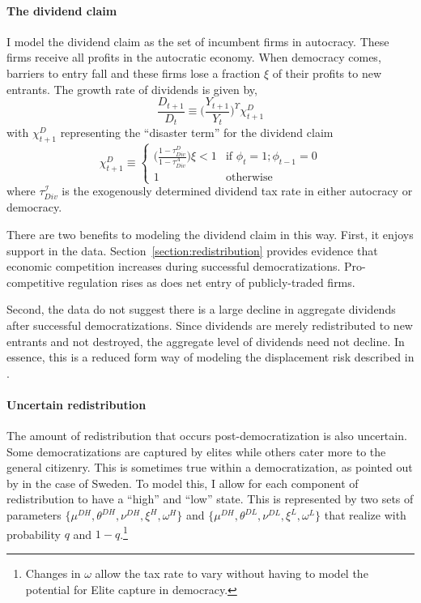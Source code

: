 \documentclass[12pt]{article}
\numberwithin{equation}{section}
\begin{document}
\paragraph{The dividend claim}
I model the dividend claim as the set of incumbent firms in autocracy.  These firms receive all profits in the autocratic economy. When democracy comes, barriers to entry fall and these firms lose a fraction $\xi$ of their profits to new entrants.  The growth rate of dividends is given by, 
\begin{equation}
\frac{D_{t+1}}{D_{t}} \equiv \bigg(\frac{Y_{t+1}}{Y_{t}}\bigg)^{\Upsilon}\chi^D_{t+1}
\end{equation}
with $\chi^D_{t+1}$ representing the ``disaster term'' for the dividend claim
\begin{equation}
\chi^D_{t+1}\equiv \begin{cases} 
\bigg(\frac{1-\tau^D_{Div}}{1-\tau^A_{Div}}\bigg)\xi < 1 & \textrm{if }\phi_{t}=1;\phi_{t-1}=0 \\
1 & \textrm{otherwise}
\end{cases}
\end{equation}
where $\tau^\mathcal{I}_{Div}$ is the exogenously determined dividend tax rate in either autocracy or democracy.

There are two benefits to modeling the dividend claim in this way. First, it enjoys support in the data. Section~\ref{section:redistribution} provides evidence that economic competition increases during successful democratizations. Pro-competitive regulation rises as does net entry of publicly-traded firms.  

Second,  the data do not suggest there is a large decline in aggregate dividends after successful democratizations. Since dividends are merely redistributed to new entrants and not destroyed, the aggregate level of dividends need not decline. In essence, this is a reduced form way of modeling the displacement risk described in \cite*{Garleanu2012}.

\paragraph{Uncertain redistribution}
The amount of redistribution that occurs post-democratization is also uncertain. Some democratizations are captured by elites while others cater more to the general citizenry. This is sometimes true within a democratization, as pointed out by \cite{Hinnerich2014} in the case of Sweden. To model this, I allow for each component of redistribution to have a ``high'' and ``low'' state. This is represented by two sets of parameters $\{\mu^{DH},\theta^{DH},\nu^{DH}, \xi^{H},\omega^H\}$ and $\{\mu^{DH},\theta^{DL},\nu^{DL}, \xi^{L},\omega^L\}$ that realize with probability $q$ and $1-q$.\footnote{Changes in $\omega$ allow the tax rate to vary without having to model the potential for Elite capture in democracy.}
\end{document}
